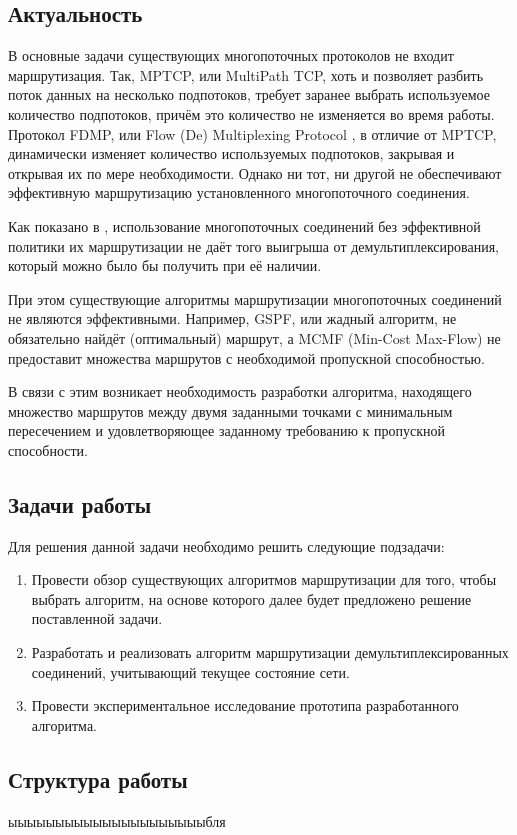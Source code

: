 \documentclass[a4paper]{article}
\begin{document}
\subsection{Актуальность}
В основные задачи существующих многопоточных протоколов не входит маршрутизация. Так, MPTCP, или MultiPath TCP, хоть и позволяет разбить поток данных на несколько подпотоков, требует заранее выбрать используемое количество подпотоков, причём это количество не изменяется во время работы. Протокол FDMP, или Flow (De) Multiplexing Protocol \cite{FDMP}, в отличие от MPTCP, динамически изменяет количество используемых подпотоков, закрывая и открывая их по мере необходимости. Однако ни тот, ни другой не обеспечивают эффективную маршрутизацию установленного многопоточного соединения. 

Как показано в \cite{stepsmel}, использование многопоточных соединений без эффективной политики их маршрутизации не даёт того выигрыша от демультиплексирования, который можно было бы получить при её наличии. 

При этом существующие алгоритмы маршрутизации многопоточных соединений не являются эффективными. Например, GSPF, или жадный алгоритм, не обязательно найдёт (оптимальный) маршрут, а MCMF (Min-Cost Max-Flow) не предоставит множества маршрутов с необходимой пропускной способностью.

В связи с этим возникает необходимость разработки алгоритма, находящего множество маршрутов между двумя заданными точками с минимальным пересечением и удовлетворяющее заданному требованию к пропускной способности.

\subsection{Задачи работы}
Для решения данной задачи необходимо решить следующие подзадачи:
\begin{enumerate}
\item Провести обзор существующих алгоритмов маршрутизации для того, чтобы выбрать алгоритм, на основе которого далее будет предложено решение поставленной задачи.
\item Разработать и реализовать алгоритм маршрутизации демультиплексированных соединений, учитывающий текущее состояние сети.
\item Провести экспериментальное исследование прототипа разработанного алгоритма.
\end{enumerate}

\subsection{Структура работы}
ыыыыыыыыыыыыыыыыыыыыыбля
\end{document}

